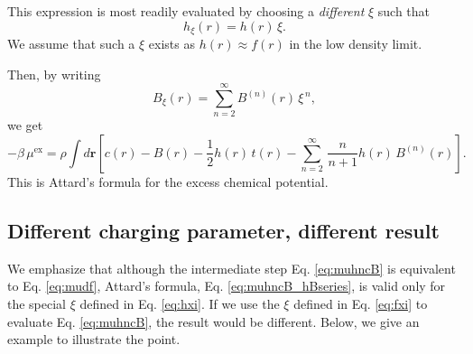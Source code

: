 \documentclass[notitlepage, preprint]{revtex4-1}
\newcommand{\vct}[1]{\mathbf{#1}}
\providecommand{\vr}{} %
\renewcommand{\vr}{\vct{r}}
\newcommand{\supex}[1]{ { { #1 }^{ \mathrm{ex} } } }
\newcommand{\muex}{\supex{\mu}}
\begin{document}
This expression is most readily evaluated
by choosing a \emph{different} $\xi$ such that
\begin{equation}
  h_{\xi}(r) = h(r) \, \xi.
  \label{eq:hxi}
\end{equation}
We assume that such a $\xi$ exists
as $h(r) \approx f(r)$ in the low density limit.

Then, by writing
\begin{equation}
  B_{\xi}(r) = \sum_{n = 2}^\infty B^{(n)}(r) \, {\xi}^{\, n},
\label{eq:Bxi}
\end{equation}
we get\cite{attard1991}
\begin{equation}
  -\beta \, \muex
=
  \rho \int d\vr
  \left[ c(r) - B(r) - \frac{1}{2} h(r) \, t(r)
   - \sum_{n = 2}^\infty \, \frac{n}{n+1} h(r) \, B^{(n)}(r) \right].
\label{eq:muhncB_hBseries}
\end{equation}
This is Attard's formula for the excess chemical potential.




\subsection{Different charging parameter, different result}



We emphasize that although
the intermediate step
Eq. \eqref{eq:muhncB} is equivalent to Eq. \eqref{eq:mudf},
Attard's formula, Eq. \eqref{eq:muhncB_hBseries}, is valid
only for the special $\xi$ defined in Eq. \eqref{eq:hxi}.
%
If we use the $\xi$ defined in Eq. \eqref{eq:fxi}
to evaluate Eq. \eqref{eq:muhncB},
the result would be different.
%
Below, we give an example to illustrate the point.
\end{document}
